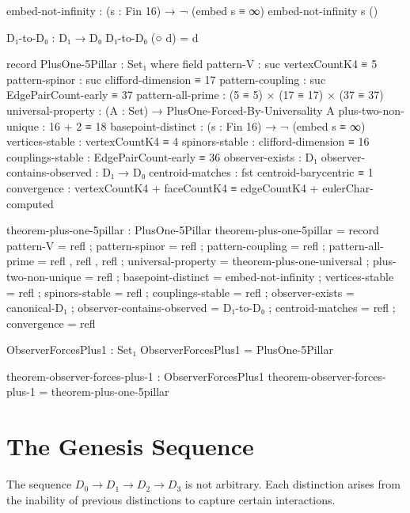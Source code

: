 \documentclass[11pt,a4paper]{book}
\begin{document}
\begin{code}
embed-not-infinity : (s : Fin 16) → ¬ (embed s ≡ ∞)
embed-not-infinity s ()

D₁-to-D₀ : D₁ → D₀
D₁-to-D₀ (○ d) = d

record PlusOne-5Pillar : Set₁ where
  field
    pattern-V : suc vertexCountK4 ≡ 5
    pattern-spinor : suc clifford-dimension ≡ 17
    pattern-coupling : suc EdgePairCount-early ≡ 37
    pattern-all-prime : (5 ≡ 5) × (17 ≡ 17) × (37 ≡ 37)
    universal-property : (A : Set) → PlusOne-Forced-By-Universality A
    plus-two-non-unique : 16 + 2 ≡ 18
    basepoint-distinct : (s : Fin 16) → ¬ (embed s ≡ ∞)
    vertices-stable : vertexCountK4 ≡ 4
    spinors-stable : clifford-dimension ≡ 16
    couplings-stable : EdgePairCount-early ≡ 36
    observer-exists : D₁
    observer-contains-observed : D₁ → D₀
    centroid-matches : fst centroid-barycentric ≡ 1
    convergence : vertexCountK4 + faceCountK4 ≡ edgeCountK4 + eulerChar-computed

theorem-plus-one-5pillar : PlusOne-5Pillar
theorem-plus-one-5pillar = record
  { pattern-V = refl
  ; pattern-spinor = refl
  ; pattern-coupling = refl
  ; pattern-all-prime = refl , refl , refl
  ; universal-property = theorem-plus-one-universal
  ; plus-two-non-unique = refl
  ; basepoint-distinct = embed-not-infinity
  ; vertices-stable = refl
  ; spinors-stable = refl
  ; couplings-stable = refl
  ; observer-exists = canonical-D₁
  ; observer-contains-observed = D₁-to-D₀
  ; centroid-matches = refl
  ; convergence = refl
  }

ObserverForcesPlus1 : Set₁
ObserverForcesPlus1 = PlusOne-5Pillar

theorem-observer-forces-plus-1 : ObserverForcesPlus1
theorem-observer-forces-plus-1 = theorem-plus-one-5pillar
\end{code}

\section{The Genesis Sequence}

The sequence $D_0 \to D_1 \to D_2 \to D_3$ is not arbitrary. Each distinction arises from the inability of previous distinctions to capture certain interactions.
\end{document}
